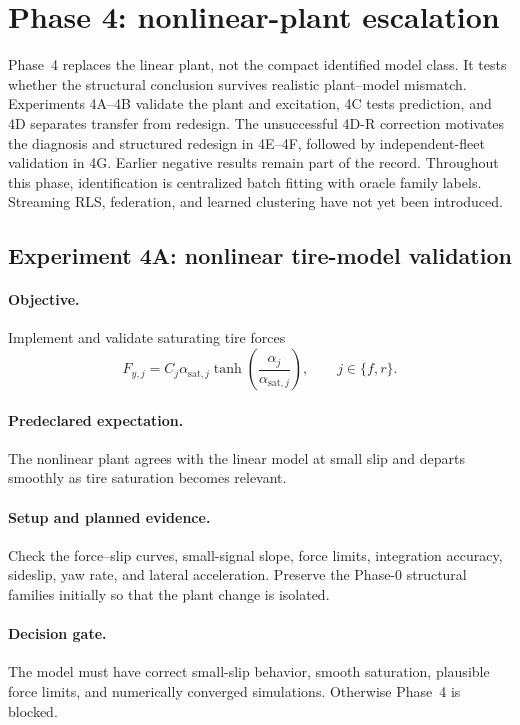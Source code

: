 \section{Phase 4: nonlinear-plant escalation}
\label{sec:phase4}
Phase~4 replaces the linear plant, not the compact identified model class. It tests
whether the structural conclusion survives realistic plant--model mismatch.
Experiments 4A--4B validate the plant and excitation, 4C tests prediction, and
4D separates transfer from redesign. The unsuccessful 4D-R correction motivates
the diagnosis and structured redesign in 4E--4F, followed by independent-fleet
validation in 4G. Earlier negative results remain
part of the record. Throughout this phase, identification is centralized batch
fitting with oracle family labels. Streaming RLS, federation, and learned
clustering have not yet been introduced.

\subsection{Experiment 4A: nonlinear tire-model validation}
\paragraph{Objective.}
Implement and validate saturating tire forces
\begin{equation}
 F_{y,j}=C_j\alpha_{\mathrm{sat},j}
 \tanh\left(\frac{\alpha_j}{\alpha_{\mathrm{sat},j}}\right),
 \qquad j\in\{f,r\}.
\end{equation}

\paragraph{Predeclared expectation.}
The nonlinear plant agrees with the linear model at small slip and departs smoothly
as tire saturation becomes relevant.

\paragraph{Setup and planned evidence.}
Check the force--slip curves, small-signal slope, force limits, integration
accuracy, sideslip, yaw rate, and lateral acceleration. Preserve the Phase-0
structural families initially so that the plant change is isolated.

\paragraph{Decision gate.}
The model must have correct small-slip behavior, smooth saturation, plausible force
limits, and numerically converged simulations. Otherwise Phase~4 is blocked.

